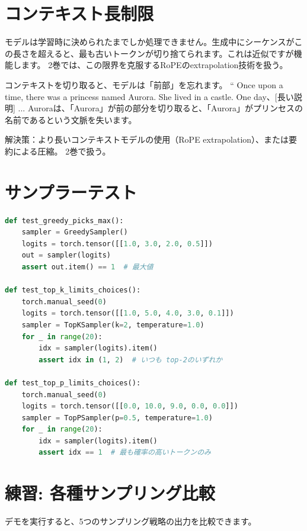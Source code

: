 \section{コンテキスト長制限}

モデルは学習時に決められたまでしか処理できません。生成中にシーケンスがこの長さを超えると、最も古いトークンが切り捨てられます。これは近似ですが機能します。 2巻では、この限界を克服するRoPEのextrapolation技術を扱う。

\begin{warnbox}
コンテキストを切り取ると、モデルは「前部」を忘れます。 `` Once upon a time, there was a princess named Aurora. She lived in a castle. One day、[長い説明] ... Auroraは、「Aurora」が前の部分を切り取ると、「Aurora」がプリンセスの名前であるという文脈を失います。

解決策：より長いコンテキストモデルの使用（RoPE extrapolation）、または要約による圧縮。 2巻で扱う。
\end{warnbox}

\section{サンプラーテスト}

\begin{lstlisting}[language=Python]
def test_greedy_picks_max():
    sampler = GreedySampler()
    logits = torch.tensor([[1.0, 3.0, 2.0, 0.5]])
    out = sampler(logits)
    assert out.item() == 1  # 最大値

def test_top_k_limits_choices():
    torch.manual_seed(0)
    logits = torch.tensor([[1.0, 5.0, 4.0, 3.0, 0.1]])
    sampler = TopKSampler(k=2, temperature=1.0)
    for _ in range(20):
        idx = sampler(logits).item()
        assert idx in (1, 2)  # いつも top-2のいずれか

def test_top_p_limits_choices():
    torch.manual_seed(0)
    logits = torch.tensor([[0.0, 10.0, 9.0, 0.0, 0.0]])
    sampler = TopPSampler(p=0.5, temperature=1.0)
    for _ in range(20):
        idx = sampler(logits).item()
        assert idx == 1  # 最も確率の高いトークンのみ
\end{lstlisting}

\section{練習: 各種サンプリング比較}

デモを実行すると、5つのサンプリング戦略の出力を比較できます。

